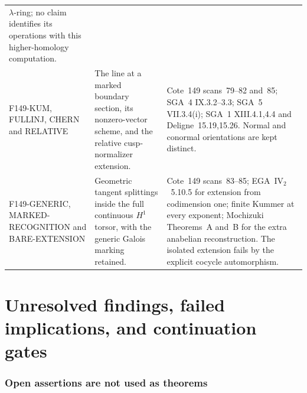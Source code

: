 \documentclass[11pt,a4paper]{article}
\theoremstyle{definition}
\begin{document}
\begin{longtable}{p{}p{}p{}}
$\lambda$-ring; no claim identifies its operations with this
higher-homology computation.\\
F149-KUM, FULLINJ, CHERN and RELATIVE &
The line at a marked boundary section, its nonzero-vector scheme,
and the relative cusp-normalizer extension. &
Cote~149 scans~79--82 and~85; SGA~4 IX.3.2--3.3;
SGA~5 VII.3.4(i); SGA~1 XIII.4.1,4.4 and Deligne~15.19,15.26.
Normal and conormal orientations are kept distinct.\\
F149-GENERIC, MARKED-RECOGNITION and BARE-EXTENSION &
Geometric tangent splittings inside the full continuous
$H^1$ torsor, with the generic Galois marking retained. &
Cote~149 scans~83--85; EGA~$\mathrm{IV}_2$~5.10.5 for extension
from codimension one; finite Kummer at every exponent;
Mochizuki Theorems~A and~B for the extra anabelian reconstruction.
The isolated extension fails by the explicit cocycle automorphism.\\
\bottomrule
\end{longtable}
\normalsize



\clearpage
\part{Unresolved findings, failed implications, and continuation gates}
\section{Open assertions are not used as theorems}
\end{document}

